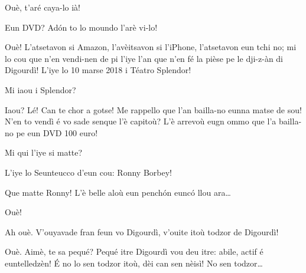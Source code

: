 \begin{drama}
\Paganspeaks Ouè, t'aré caya-lo ià!

\Nevaousaspeaks Eun DVD? Ad\'on to lo moundo l'arè vi-lo!

\Paganspeaks Ouè! L'atsetavon si Amazon, l'avèitsavon si l'iPhone, l'atsetavon eun tchi no; mi lo cou que n'en vendi-nen de pi l'iye l'an que n'en fé la pièse pe le dji-z-àn di Digourdì! L'iye lo 10 marse 2018 i Téatro Splendor!

\Nevaouspeaks Mi iaou i Splendor?

\Paganspeaks Iaou?  Lé! Can te chor a gotse! Me rappello que l'an bailla-no eunna matse de sou! N'en to vendì é vo sade senque l'è capitoù? L'è arrevoù eugn ommo que l'a bailla-no pe eun DVD 100 euro!

\Nevaousaspeaks Mi qui l'iye si matte?

\Maganspeaks L'iye lo Seunteucco d'eun cou: Ronny Borbey!

\Paganspeaks Que matte Ronny! L'è belle aloù eun pench\'on euncó llou ara\ldots

\Maganspeaks Ouè!

\Nevaouspeaks Ah ouè. V'ouyavade fran feun vo Digourdì, v'ouite itoù todzor de Digourdì!

\Paganspeaks Ouè. Aimè, te sa pequé?  Pequé itre Digourdì vou deu itre: abile, actif é euntelledzèn! \'E no lo sen todzor itoù, dèi can sen nèisì! No sen todzor\ldots 


\ridocliou

\DeriLeRido




\end{drama}
